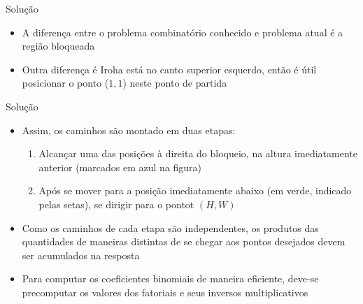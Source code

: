 \begin{frame}[fragile]{Solução}

    \begin{itemize}
        \item A diferença entre o problema combinatório conhecido e problema atual é a região
            bloqueada

        \item Outra diferença é Iroha está no canto superior esquerdo, então é útil posicionar o 
            ponto ($1, 1$) neste ponto de partida 

            

    \end{itemize}

\end{frame}

\begin{frame}[fragile]{Solução}

    \begin{itemize}
        \item Assim, os caminhos são montado em duas etapas:
        \begin{enumerate}
            \item Alcançar uma das posições à direita do bloqueio, na altura imediatamente 
                anterior (marcados em azul na figura)

            \item Após se mover para a posição imediatamente abaixo (em verde, indicado pelas
                setas), se dirigir para o pontot $(H, W)$
        \end{enumerate}

        \item Como os caminhos de cada etapa são independentes, os produtos das quantidades de
            maneiras distintas de se chegar aos pontos desejados devem ser acumulados
            na resposta

        \item Para computar os coeficientes binomiais de maneira eficiente, deve-se precomputar
            os valores dos fatoriais e seus inversos multiplicativos 
    \end{itemize}

\end{frame}

